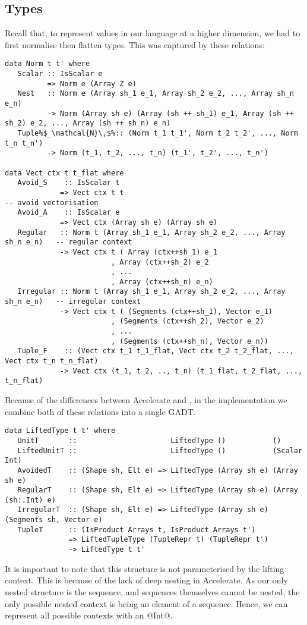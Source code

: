 \subsection{Types}
Recall that, to represent values in our language at a higher dimension, we had to first normalise then flatten types. This was captured by these relations:
%
\begin{lstlisting}[style=ndp]
data Norm t t' where
   Scalar :: IsScalar e
          => Norm e (Array Z e)
   Nest   :: Norm e (Array sh_1 e_1, Array sh_2 e_2, ..., Array sh_n e_n)
          -> Norm (Array sh e) (Array (sh ++ sh_1) e_1, Array (sh ++ sh_2) e_2, ..., Array (sh ++ sh_n) e_n)
   Tuple%$_\mathcal{N}\,$%:: (Norm t_1 t_1', Norm t_2 t_2', ..., Norm t_n t_n')
          -> Norm (t_1, t_2, ..., t_n) (t_1', t_2', ..., t_n')

data Vect ctx t t_flat where
   Avoid_S    :: IsScalar t
             => Vect ctx t t                                             -- avoid vectorisation
   Avoid_A    :: IsScalar e
             => Vect ctx (Array sh e) (Array sh e)
   Regular   :: Norm t (Array sh_1 e_1, Array sh_2 e_2, ..., Array sh_n e_n)   -- regular context
             -> Vect ctx t ( Array (ctx++sh_1) e_1
                         , Array (ctx++sh_2) e_2
                         , ...
                         , Array (ctx++sh_n) e_n)
   Irregular :: Norm t (Array sh_1 e_1, Array sh_2 e_2, ..., Array sh_n e_n)   -- irregular context
             -> Vect ctx t ( (Segments (ctx++sh_1), Vector e_1)
                         , (Segments (ctx++sh_2), Vector e_2)
                         , ...
                         , (Segments (ctx++sh_n), Vector e_n))
   Tuple_F    :: (Vect ctx t_1 t_1_flat, Vect ctx t_2 t_2_flat, ..., Vect ctx t_n t_n_flat)
             -> Vect ctx (t_1, t_2, .., t_n) (t_1_flat, t_2_flat, ..., t_n_flat)
\end{lstlisting}
%
Because of the differences between Accelerate and \ndp{}, in the implementation we combine both of these relations into a single GADT.
%
\begin{lstlisting}
data LiftedType t t' where
   UnitT       ::                      LiftedType ()           ()
   LiftedUnitT ::                      LiftedType ()           (Scalar Int)
   AvoidedT    :: (Shape sh, Elt e) => LiftedType (Array sh e) (Array sh e)
   RegularT    :: (Shape sh, Elt e) => LiftedType (Array sh e) (Array (sh:.Int) e)
   IrregularT  :: (Shape sh, Elt e) => LiftedType (Array sh e) (Segments sh, Vector e)
   TupleT      :: (IsProduct Arrays t, IsProduct Arrays t')
               => LiftedTupleType (TupleRepr t) (TupleRepr t')
               -> LiftedType t t'
\end{lstlisting}
%
It is important to note that this structure is not parameterised by the lifting context. This is because of the lack of deep nesting in Accelerate. As our only nested structure is the sequence, and sequences themselves cannot be nested, the only possible nested context is being an element of a sequence. Hence, we can represent all possible contexts with an @Int@.


